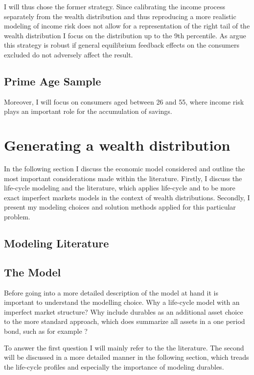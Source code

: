 \documentclass[a4paper,12pt]{article}
\begin{document}
I will thus chose the former strategy. Since calibrating the income process separately from the wealth distribution and thus reproducing a more realistic modeling of income risk does not allow for a representation of the right tail of the wealth distribution I focus on the distribution up to the 9th percentile. As \cite{hintermaier2011} argue this strategy is robust if general equilibrium feedback effects on the consumers excluded do not adversely affect the result.

\subsection{Prime Age Sample}
Moreover, I will focus on consumers aged between 26 and 55, where income risk plays an important role for the accumulation of savings. 


\section{Generating a wealth distribution}
\label{Chapter3}
In the following section I discuss the economic model considered and outline the most important considerations made within the literature. Firstly, I discuss the life-cycle modeling and the literature, which applies life-cycle and to be more exact imperfect markets models in the context of wealth distributions. Secondly, I present my modeling choices and solution methods applied for this particular problem. 
\subsection{Modeling Literature}

\subsection{The Model}
Before going into a more detailed description of the model at hand it is important to understand the modelling choice. Why a life-cycle model with an imperfect market structure? Why include durables as an  additional asset choice to the more standard approach, which does summarize all assets in a one period bond, such as for example \cite{hintermaier2011}? 

To answer the first question I will mainly refer to the the literature. The second will be discussed in a more detailed manner in the following section, which treads the life-cycle profiles and especially the importance of modeling durables. 
\end{document}
